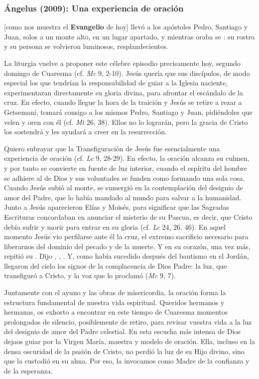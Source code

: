\subsubsection{Ángelus (2009): Una experiencia de oración}


\begin{body}
 [como nos muestra el \textbf{Evangelio} de hoy] llevó a los apóstoles Pedro, Santiago y Juan, solos a un monte alto, en un lugar apartado, y mientras oraba se : su rostro y su persona se volvieron luminosos, resplandecientes.

La liturgia vuelve a proponer este célebre episodio precisamente hoy, segundo domingo de Cuaresma (cf. \textit{Mc} 9, 2-10). Jesús quería que sus discípulos, de modo especial los que tendrían la responsabilidad de guiar a la Iglesia naciente, experimentaran directamente su gloria divina, para afrontar el escándalo de la cruz. En efecto, cuando llegue la hora de la traición y Jesús se retire a rezar a Getsemaní, tomará consigo a los mismos Pedro, Santiago y Juan, pidiéndoles que velen y oren con él (cf. \textit{Mt} 26, 38). Ellos no lo lograrán, pero la gracia de Cristo los sostendrá y les ayudará a creer en la resurrección.

Quiero subrayar que la Transfiguración de Jesús fue esencialmente una experiencia de oración (cf. \textit{Lc} 9, 28-29). En efecto, la oración alcanza su culmen, y por tanto se convierte en fuente de luz interior, cuando el espíritu del hombre se adhiere al de Dios y sus voluntades se funden como formando una sola cosa. Cuando Jesús subió al monte, se sumergió en la contemplación del designio de amor del Padre, que lo había mandado al mundo para salvar a la humanidad. Junto a Jesús aparecieron Elías y Moisés, para significar que las Sagradas Escrituras concordaban en anunciar el misterio de su Pascua, es decir, que Cristo debía sufrir y morir para entrar en su gloria (cf. \textit{Lc} 24, 26. 46). En aquel momento Jesús vio perfilarse ante él la cruz, el extremo sacrificio necesario para liberarnos del dominio del pecado y de la muerte. Y en su corazón, una vez más, repitió su . Dijo , , . Y, como había sucedido después del bautismo en el Jordán, llegaron del cielo los signos de la complacencia de Dios Padre: la luz, que transfiguró a Cristo, y la voz que lo proclamó  (\textit{Mc} 9, 7).

Juntamente con el ayuno y las obras de misericordia, la oración forma la estructura fundamental de nuestra vida espiritual. Queridos hermanos y hermanas, os exhorto a encontrar en este tiempo de Cuaresma momentos prolongados de silencio, posiblemente de retiro, para revisar vuestra vida a la luz del designio de amor del Padre celestial. En esta escucha más intensa de Dios dejaos guiar por la Virgen María, maestra y modelo de oración. Ella, incluso en la densa oscuridad de la pasión de Cristo, no perdió la luz de su Hijo divino, sino que la custodió en su alma. Por eso, la invocamos como Madre de la confianza y de la esperanza.
\end{body}

